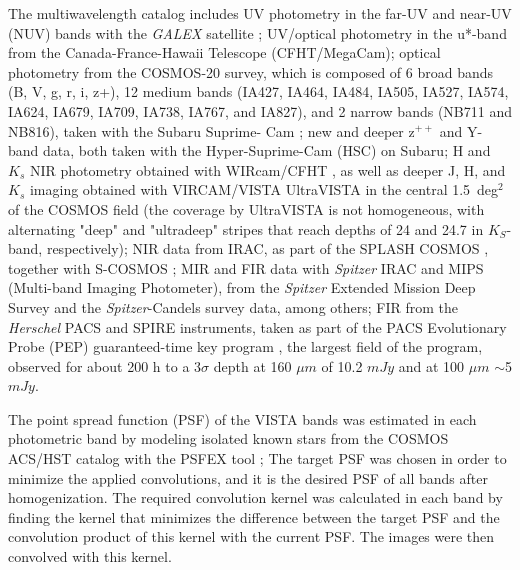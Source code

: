 The multiwavelength catalog includes UV photometry in the far-UV and near-UV (NUV) bands with the \textit{GALEX} satellite \citep{2007ApJS..172..468Z}; UV/optical photometry in the u*-band from the Canada-France-Hawaii Telescope (CFHT/MegaCam); optical photometry from the COSMOS-20 survey, which is composed of 6 broad bands (B, V, g, r, i, z+), 12 medium bands (IA427, IA464, IA484, IA505, IA527, IA574, IA624, IA679, IA709, IA738, IA767, and IA827), and 2 narrow bands (NB711 and NB816), taken with the Subaru Suprime- Cam \citep{2007ApJS..172....9T, 2015PASJ...67..104T}; new and deeper z$^{++}$ and Y-band data, both taken with the Hyper-Suprime-Cam (HSC) on Subaru; H and $K_s$ NIR photometry obtained with WIRcam/CFHT \citep{2010ApJ...708..202M}, as well as deeper J, H, and $K_s$ imaging obtained with VIRCAM/VISTA UltraVISTA \citep{2012A&A...544A.156M} in the central 1.5~deg$^2$ of the COSMOS field (the coverage by
UltraVISTA is not homogeneous, with alternating "deep" and "ultradeep" stripes that reach depths of 24 and 24.7 in $K_S$-band, respectively); NIR data from IRAC, as part of the SPLASH COSMOS
, together with S-COSMOS \citep{2007ApJS..172...86S}; MIR and FIR data with \textit{Spitzer} IRAC and MIPS (Multi-band Imaging Photometer), from the \textit{Spitzer} Extended Mission Deep Survey and the \textit{Spitzer}-Candels survey \citep{2015ApJS..218...33A} data, among others; FIR from the \textit{Herschel} PACS and SPIRE instruments, taken as part of the PACS Evolutionary Probe (PEP) guaranteed-time key program \citep{2011A&A...532A..90L}, the largest field of the program, observed for about 200 h to a 3$\sigma$ depth at 160 $\mu m$ of 10.2 $mJy$ and at 100 $\mu m$ $\sim$5 $mJy$.


The point spread function (PSF) of the VISTA bands was estimated in each photometric band by modeling isolated known stars from the COSMOS ACS/HST catalog \citep{2007ApJS..172..196K, 2007ApJS..172..219L} with the PSFEX tool \citep{2013ascl.soft01001B}; 
The target PSF was chosen in order to minimize the applied convolutions, and it is the desired PSF of all bands after homogenization.
The required convolution kernel was calculated in each band by finding the kernel that minimizes the difference between the target PSF and the convolution product of this kernel with the current PSF. The images were then convolved with this kernel.

